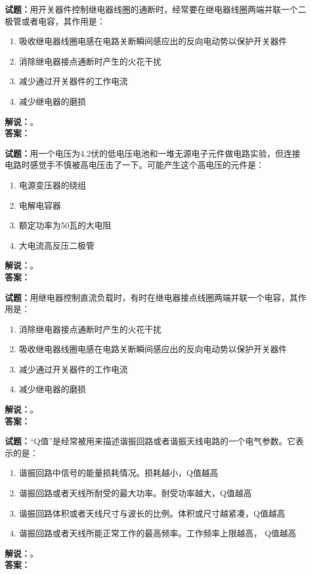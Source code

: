 \documentclass{ctexbook}
\begin{document}
\bigskip




\noindent\textbf{试题：}用开关器件控制继电器线圈的通断时，经常要在继电器线圈两端并联一个二极管或者电容，其作用是：
\begin{enumerate}[leftmargin=3em]
\item 吸收继电器线圈电感在电路关断瞬间感应出的反向电动势以保护开关器件
\item 消除继电器接点通断时产生的火花干扰
\item 减少通过开关器件的工作电流
\item 减少继电器的磨损
\end{enumerate}
\noindent\textbf{解说：}\textbf{}。\\\noindent\textbf{答案：}

\bigskip




\noindent\textbf{试题：}用一个电压为4.2伏的低电压电池和一堆无源电子元件做电路实验，但连接电路时感觉手不慎被高电压击了一下。可能产生这个高电压的元件是：
\begin{enumerate}[leftmargin=3em]
\item 电源变压器的绕组
\item 电解电容器
\item 额定功率为50瓦的大电阻
\item 大电流高反压二极管
\end{enumerate}
\noindent\textbf{解说：}\textbf{}。\\\noindent\textbf{答案：}

\bigskip




\noindent\textbf{试题：}用继电器控制直流负载时，有时在继电器接点线圈两端并联一个电容，其作用是：
\begin{enumerate}[leftmargin=3em]
\item 消除继电器接点通断时产生的火花干扰
\item 吸收继电器线圈电感在电路关断瞬间感应出的反向电动势以保护开关器件
\item 减少通过开关器件的工作电流
\item 减少继电器的磨损
\end{enumerate}
\noindent\textbf{解说：}\textbf{}。\\\noindent\textbf{答案：}

\bigskip




\noindent\textbf{试题：}“Q值”是经常被用来描述谐振回路或者谐振天线电路的一个电气参数。它表示的是：
\begin{enumerate}[leftmargin=3em]
\item 谐振回路中信号的能量损耗情况。损耗越小，Q值越高
\item 谐振回路或者天线所耐受的最大功率。耐受功率越大，Q值越高
\item 谐振回路体积或者天线尺寸与波长的比例。体积或尺寸越紧凑，Q值越高
\item 谐振回路或者天线所能正常工作的最高频率。工作频率上限越高， Q值越高
\end{enumerate}
\noindent\textbf{解说：}\textbf{}。\\\noindent\textbf{答案：}
\end{document}
